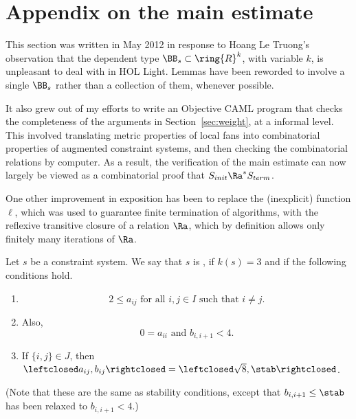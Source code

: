 

\section{Appendix on the main estimate}\label{sec:sup-local-fan}

This section was written in May 2012 in response to Hoang Le Truong's observation that the dependent type $\BB_s\subset \ring{R}^k$, with variable $k$, is unpleasant to deal with in HOL Light.  Lemmas have been reworded to involve a single $\BB_s$
rather than a collection of them, whenever possible.

 It also grew out of my efforts to write an Objective CAML program that checks the completeness of the arguments in Section~\ref{sec:weight}, at a informal level.  This involved translating metric properties of local fans into combinatorial
properties of augmented constraint systems, and then checking the combinatorial
relations by computer.  As a result, the verification of the main estimate
can now largely be viewed as a combinatorial proof that $S_{init}\Ra^* S_{term}$.

One other improvement in exposition has been to replace the (inexplicit)
function $\ell$, which was used to guarantee finite termination of algorithms,
with the reflexive transitive closure of a relation $\Ra$, which by definition
allows only finitely many iterations of $\Ra$.

\begin{definition}
Let $s$ be a constraint system.  We say that $s$ is , if $k(s)=3$
and if the
following conditions hold.
\begin{enumerate}
\item 
\[
2\le a_{ij} \text{ for all }  i,j\in I \text{ such that } i\ne j.
\]  
\item
  Also, 
\[0 = a_{ii}\text{ and }
  b_{i,i+1} < 4.
\]  
\item
If $\{i,j\}\in J$, then $\leftclosed
  a_{ij},b_{ij}\rightclosed=\leftclosed\sqrt{8},\stab\rightclosed$.
\end{enumerate}
(Note that these are the same as stability conditions, except that
$b_{i,i+1}\le \stab$ has been relaxed to $b_{i,i+1}<4$.)
\end{definition}

